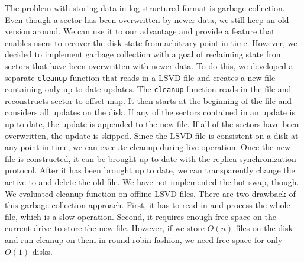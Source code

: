 The problem with storing data in log structured format is garbage collection. Even though a sector has been overwritten by newer data, we still keep an old version around. We can use it to our advantage and provide a feature that enables users to recover the disk state from arbitrary point in time. However, we decided to implement garbage collection with a goal of reclaiming state from sectors that have been overwritten with newer data. To do this, we developed a separate \texttt{cleanup} function that reads in a LSVD file and creates a new file containing only up-to-date updates. The \texttt{cleanup} function reads in the file and reconstructs sector to offset map. It then starts at the beginning of the file and considers all updates on the disk. If any of the sectors contained in an update is up-to-date, the update is appended to the new file. If all of the sectors have been overwritten, the update is skipped. Since the LSVD file is consistent on a disk at any point in time, we can execute cleanup during live operation. Once the new file is constructed, it can be brought up to date with the replica synchronization protocol. After it has been brought up to date, we can transparently change the active to and delete the old file. We have not implemented the hot swap, though. We evaluated cleanup function on offline LSVD files. There are two drawback of this garbage collection approach. First, it has to read in and process the whole file, which is a slow operation. Second, it requires enough free space on the current drive to store the new file. However, if we store $O(n)$ files on the disk and run cleanup on them in round robin fashion, we need free space for only $O(1)$ disks.

